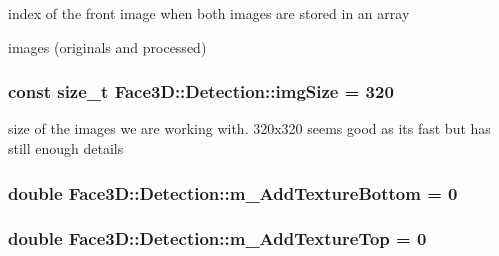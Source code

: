 index of the front image when both images are stored in an array 

images (originals and processed) 
\subsubsection[{\texorpdfstring{img\+Size}{imgSize}}]{\setlength{\rightskip}{0pt plus 5cm}const size\+\_\+t Face3\+D\+::\+Detection\+::img\+Size = 320\hspace{0.3cm}{\ttfamily [private]}}\hypertarget{class_face3_d_1_1_detection_a7d9ef90ae57f59f0e73edec0dffd9bd7}{}\label{class_face3_d_1_1_detection_a7d9ef90ae57f59f0e73edec0dffd9bd7}


size of the images we are working with. 320x320 seems good as its fast but has still enough details 

\subsubsection[{\texorpdfstring{m\+\_\+\+Add\+Texture\+Bottom}{m_AddTextureBottom}}]{\setlength{\rightskip}{0pt plus 5cm}double Face3\+D\+::\+Detection\+::m\+\_\+\+Add\+Texture\+Bottom = 0\hspace{0.3cm}{\ttfamily [private]}}\hypertarget{class_face3_d_1_1_detection_a7ce314f4e8ab7f9ce1d2c8d38d7ed6b3}{}\label{class_face3_d_1_1_detection_a7ce314f4e8ab7f9ce1d2c8d38d7ed6b3}
\subsubsection[{\texorpdfstring{m\+\_\+\+Add\+Texture\+Top}{m_AddTextureTop}}]{\setlength{\rightskip}{0pt plus 5cm}double Face3\+D\+::\+Detection\+::m\+\_\+\+Add\+Texture\+Top = 0\hspace{0.3cm}{\ttfamily [private]}}\hypertarget{class_face3_d_1_1_detection_af14dc904e457d96b31ac6e329160936a}{}\label{class_face3_d_1_1_detection_af14dc904e457d96b31ac6e329160936a}
